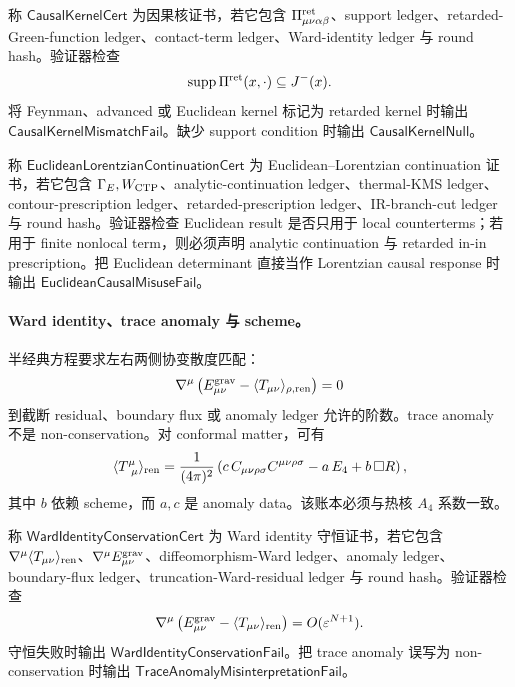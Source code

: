 \begin{definition}[因果核证书]\label{def:typed-address-biaxial-completion-causal-kernel-cert}
称 \(\mathsf{CausalKernelCert}\) 为因果核证书，若它包含 \(\Pi^{\rm ret}_{\mu\nu\alpha\beta}\)、support ledger、retarded-Green-function ledger、contact-term ledger、Ward-identity ledger 与 round hash。验证器检查
\[
{\rm supp}\,\Pi^{\rm ret}(x,\cdot)\subseteq J^-(x).
\]
将 Feynman、advanced 或 Euclidean kernel 标记为 retarded kernel 时输出 \(\mathsf{CausalKernelMismatchFail}\)。缺少 support condition 时输出 \(\mathsf{CausalKernelNull}\)。
\end{definition}

\begin{definition}\label{def:typed-address-biaxial-completion-euclidean-lorentzian-continuation-cert}
称 \(\mathsf{EuclideanLorentzianContinuationCert}\) 为 Euclidean--Lorentzian continuation 证书，若它包含 \(\Gamma_E,W_{\rm CTP}\)、analytic-continuation ledger、thermal-KMS ledger、contour-prescription ledger、retarded-prescription ledger、IR-branch-cut ledger 与 round hash。验证器检查 Euclidean result 是否只用于 local counterterms；若用于 finite nonlocal term，则必须声明 analytic continuation 与 retarded in-in prescription。把 Euclidean determinant 直接当作 Lorentzian causal response 时输出 \(\mathsf{EuclideanCausalMisuseFail}\)。
\end{definition}

\paragraph{Ward identity、trace anomaly 与 scheme。}
半经典方程要求左右两侧协变散度匹配：
\[
\nabla^\mu
\left(
E_{\mu\nu}^{\rm grav}
-
\langle T_{\mu\nu}\rangle_{\rho,{\rm ren}}
\right)=0
\]
到截断 residual、boundary flux 或 anomaly ledger 允许的阶数。trace anomaly 不是 non-conservation。对 conformal matter，可有
\[
\langle T^\mu_{\ \mu}\rangle_{\rm ren}
=
\frac{1}{(4\pi)^2}
\left(
c\,C_{\mu\nu\rho\sigma}C^{\mu\nu\rho\sigma}
-a\,E_4
+b\,\Box R
\right),
\]
其中 \(b\) 依赖 scheme，而 \(a,c\) 是 anomaly data。该账本必须与热核 \(A_4\) 系数一致。

\begin{definition}\label{def:typed-address-biaxial-completion-ward-identity-conservation-cert}
称 \(\mathsf{WardIdentityConservationCert}\) 为 Ward identity 守恒证书，若它包含 \(\nabla^\mu\langle T_{\mu\nu}\rangle_{\rm ren}\)、\(\nabla^\mu E_{\mu\nu}^{\rm grav}\)、diffeomorphism-Ward ledger、anomaly ledger、boundary-flux ledger、truncation-Ward-residual ledger 与 round hash。验证器检查
\[
\nabla^\mu
\left(
E_{\mu\nu}^{\rm grav}
-
\langle T_{\mu\nu}\rangle_{\rm ren}
\right)
=
O(\varepsilon^{N+1}).
\]
守恒失败时输出 \(\mathsf{WardIdentityConservationFail}\)。把 trace anomaly 误写为 non-conservation 时输出 \(\mathsf{TraceAnomalyMisinterpretationFail}\)。
\end{definition}

